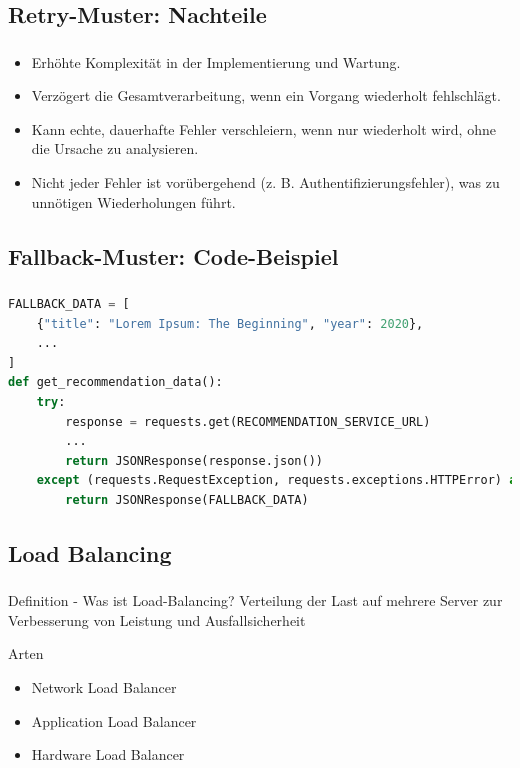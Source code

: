 \subsection{Retry-Muster: Nachteile}
\begin{frame}
    \frametitle{\insertsection}
    \framesubtitle{\insertsubsection}

    \begin{itemize}
        \item Erhöhte Komplexität in der Implementierung und Wartung.
        \item Verzögert die Gesamtverarbeitung, wenn ein Vorgang wiederholt fehlschlägt.
        \item Kann echte, dauerhafte Fehler verschleiern, wenn nur wiederholt wird, ohne die Ursache zu analysieren.
        \item Nicht jeder Fehler ist vorübergehend (z. B. Authentifizierungsfehler), was zu unnötigen Wiederholungen führt.
    \end{itemize}
\end{frame}

\subsection{\textbf{Fallback-Muster: Code-Beispiel}}

\begin{frame}[fragile]
    \frametitle{\insertsection}
    \framesubtitle{\insertsubsection}


    \begin{lstlisting}[language=Python]
FALLBACK_DATA = [
    {"title": "Lorem Ipsum: The Beginning", "year": 2020},
    ...
]
def get_recommendation_data():
    try:
        response = requests.get(RECOMMENDATION_SERVICE_URL)
        ...
        return JSONResponse(response.json())
    except (requests.RequestException, requests.exceptions.HTTPError) as e:
        return JSONResponse(FALLBACK_DATA)
    \end{lstlisting}
\end{frame}


\subsection{\textbf{Load Balancing}}
\begin{frame}
    \frametitle{\insertsection}
    \framesubtitle{\insertsubsection}
    \begin{block}{Definition - Was ist Load-Balancing?}
        Verteilung der Last auf mehrere Server zur Verbesserung von Leistung und Ausfallsicherheit
    \end{block}
    \begin{block}{Arten}
        \begin{itemize}
       		\item Network Load Balancer
       		\item Application Load Balancer
        	\item Hardware Load Balancer
         \end{itemize}
    \end{block}
\end{frame}

